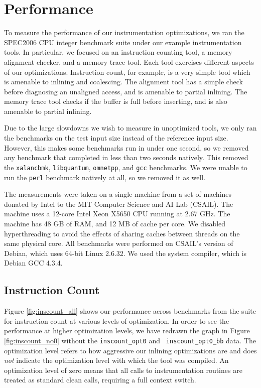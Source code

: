 \chapter{Performance}
\label{sec:performance}

To measure the performance of our instrumentation optimizations, we ran the
SPEC2006 CPU integer benchmark suite under our example instrumentation tools.
In particular, we focused on an instruction counting tool, a memory alignment
checker, and a memory trace tool.  Each tool exercises different aspects of our
optimizations.  Instruction count, for example, is a very simple tool which is
amenable to inlining and coalescing.  The alignment tool has a simple check
before diagnosing an unaligned access, and is amenable to partial inlining.  The
memory trace tool checks if the buffer is full before inserting, and is also
amenable to partial inlining.

Due to the large slowdowns we wish to measure in unoptimized tools, we only ran
the benchmarks on the test input size instead of the reference input size.
However, this makes some benchmarks run in under one second, so we removed any
benchmark that completed in less than two seconds natively.  This removed the
{\tt xalancbmk}, {\tt libquantum}, {\tt omnetpp}, and {\tt gcc} benchmarks.  We
were unable to run the {\tt perl} benchmark natively at all, so we removed it as
well.

The measurements were taken on a single machine from a set of machines donated
by Intel to the MIT Computer Science and AI Lab (CSAIL).  The machine uses a
12-core Intel Xeon X5650 CPU running at 2.67 GHz.  The machine has 48 GB of RAM,
and 12 MB of cache per core.  We disabled hyperthreading to avoid the effects of
sharing caches between threads on the same physical core.  All benchmarks were
performed on CSAIL's version of Debian, which uses 64-bit Linux 2.6.32.  We used
the system compiler, which is Debian GCC 4.3.4.

\section{Instruction Count}

Figure \ref{fig:inscount_all} shows our performance across benchmarks from the
suite for instruction count at various levels of optimization.  In order to see
the performance at higher optimization levels, we have redrawn the graph in
Figure \ref{fig:inscount_no0} without the {\tt inscount\_opt0} and {\tt
inscount\_opt0\_bb} data.  The optimization level refers to how aggressive our
inlining optimizations are and does {\em not} indicate the optimization level
with which the tool was compiled.  An optimization level of zero means that all
calls to instrumentation routines are treated as standard clean calls, requiring
a full context switch.

